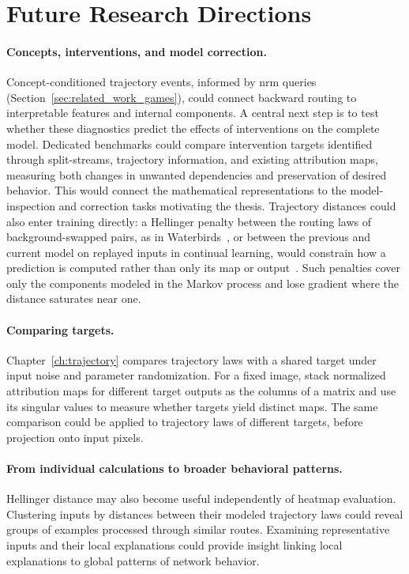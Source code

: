 \section{Future Research Directions}\label{sec:future_directions}

\paragraph{Concepts, interventions, and model correction.}
Concept-conditioned trajectory events, informed by \ac{nrm} queries (Section~\ref{sec:related_work_games}), could connect backward routing to interpretable features and internal components. A central next step is to test whether these diagnostics predict the effects of interventions on the complete model. Dedicated benchmarks could compare intervention targets identified through split-streams, trajectory information, and existing attribution maps, measuring both changes in unwanted dependencies and preservation of desired behavior. This would connect the mathematical representations to the model-inspection and correction tasks motivating the thesis. Trajectory distances could also enter training directly: a Hellinger penalty between the routing laws of background-swapped pairs, as in Waterbirds~\parencite{Sagawa2020GroupDRO}, or between the previous and current model on replayed inputs in continual learning, would constrain how a prediction is computed rather than only its map or output~\parencite{Fel2026MechanisticShaping}. Such penalties cover only the components modeled in the Markov process and lose gradient where the distance saturates near one.

\paragraph{Comparing targets.}
Chapter~\ref{ch:trajectory} compares trajectory laws with a shared target under input noise and parameter randomization. For a fixed image, \textcite{Maess2026Spectral} stack normalized attribution maps for different target outputs as the columns of a matrix and use its singular values to measure whether targets yield distinct maps. The same comparison could be applied to trajectory laws of different targets, before projection onto input pixels.

\paragraph{From individual calculations to broader behavioral patterns.}
Hellinger distance may also become useful independently of heatmap evaluation. Clustering inputs by distances between their modeled trajectory laws could reveal groups of examples processed through similar routes. Examining representative inputs and their local explanations could provide insight linking local explanations to global patterns of network behavior.

